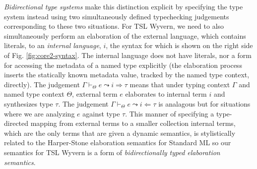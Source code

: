 \emph{Bidirectional type systems} \cite{Pierce:2000:LTI:345099.345100} make this distinction explicit by specifying the type system instead using two simultaneously defined typechecking judgements corresponding to these two situations. %
For TSL Wyvern, we need to also simultaneously perform an elaboration of the external language, which contains literals, to an \emph{internal language}, $i$, the syntax for which is shown on the right side of Fig. \ref{fig:core2-syntax}. The internal language does not have literals, nor a form for accessing the metadata of a named type explicitly (the elaboration process inserts the statically known metadata value, tracked by the named type context, directly). The judgement $\Gamma \vdash_\Theta e \leadsto i \Rightarrow \tau$ means that under typing context $\Gamma$ and named type context $\Theta$, external term $e$ elaborates to internal term $i$ and synthesizes type $\tau$. The judgement $\Gamma \vdash_\Theta e \leadsto i \Leftarrow \tau$ is analagous but for situations where we are analyzing $e$ against type $\tau$. This manner of specifying a type-directed mapping from external terms to a smaller collection internal terms, which are the only terms that are given a dynamic semantics, is stylistically related to the Harper-Stone elaboration semantics for Standard ML \cite{Harper00atype-theoretic} so  our semantics for TSL Wyvern is a form of \emph{bidirectionally typed elaboration semantics}.%

